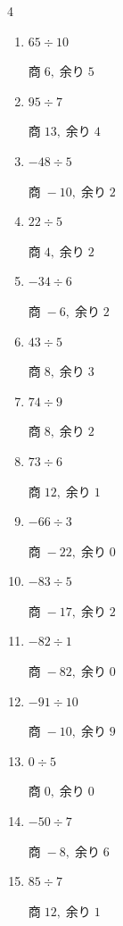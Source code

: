 \begin{multicols}{4}
\begin{enumerate}
  \item $65 \div 10$

        $商\; 6,\; 余り\; 5$

\columnbreak %

  \item $95 \div 7$

        $商\; 13,\; 余り\; 4$

  \item $-48 \div 5$

        $商\; -10,\; 余り\; 2$

  \item $22 \div 5$

        $商\; 4,\; 余り\; 2$

  \item $-34 \div 6$

        $商\; -6,\; 余り\; 2$

  \item $43 \div 5$

        $商\; 8,\; 余り\; 3$

  \item $74 \div 9$

        $商\; 8,\; 余り\; 2$

  \item $73 \div 6$

        $商\; 12,\; 余り\; 1$

  \item $-66 \div 3$

        $商\; -22,\; 余り\; 0$

  \item $-83 \div 5$

        $商\; -17,\; 余り\; 2$

  \item $-82 \div 1$

        $商\; -82,\; 余り\; 0$

  \item $-91 \div 10$

        $商\; -10,\; 余り\; 9$

  \item $0 \div 5$

        $商\; 0,\; 余り\; 0$

  \item $-50 \div 7$

        $商\; -8,\; 余り\; 6$

  \item $85 \div 7$

        $商\; 12,\; 余り\; 1$


\end{enumerate}
\end{multicols}
